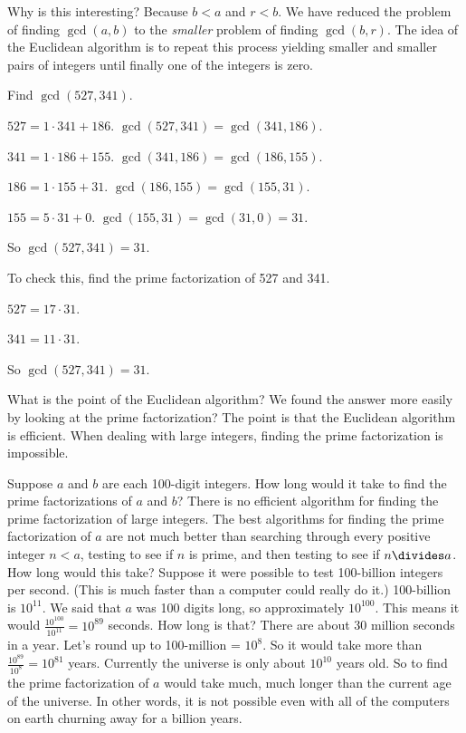 \documentclass[oneside,12pt]{amsart}
\begin{document}
Why is this interesting? Because $b<a$ and $r<b$. We have reduced the problem of finding $\gcd(a,b)$
to the \emph{smaller} problem of finding $\gcd(b,r)$. The idea of the Euclidean algorithm is to
repeat this process yielding smaller and smaller pairs of integers until finally one of the integers is zero.

\begin{example}
Find $\gcd(527,341)$.

$527 = 1 \cdot 341 + 186$. \qquad $\gcd(527,341) = \gcd(341,186)$.

$341 = 1 \cdot 186 + 155$. \qquad $\gcd(341, 186) = \gcd(186, 155)$.

$186 = 1 \cdot 155 +  31$. \qquad $\gcd(186, 155) = \gcd(155, 31)$.

$155 = 5 \cdot 31 + 0$. \qquad $\gcd(155, 31) = \gcd(31, 0) = 31$.

So $\gcd (527,341) = 31$.

To check this, find the prime factorization of 527 and 341.

$527 = 17 \cdot 31$.

$341 = 11 \cdot 31$.

So $\gcd(527, 341) = 31$.
\end{example}

What is the point of the Euclidean algorithm? We found the answer more easily by looking at the prime factorization? The point is that
the Euclidean algorithm is efficient. When dealing with large integers, finding the prime factorization is impossible.

Suppose $a$ and $b$ are each 100-digit integers. How long would it take to find the prime factorizations of $a$ and $b$?
There is no efficient algorithm for finding the prime factorization of large integers. The best algorithms for finding the prime factorization of $a$
are not much better than searching through every positive integer $n<a$, testing to see if $n$ is prime, and then testing to see if $n\divides a$.
How long would this take? Suppose it were possible to test 100-billion integers per second. (This is much faster than a computer could really do it.)
100-billion is $10^{11}$. We said that $a$ was 100 digits long, so approximately $10^{100}$. This means it would $\frac{10^{100}}{10^{11}} = 10^{89}$ seconds.
How long is that?
There are about 30 million seconds in a year. Let's round up to 100-million = $10^8$. So it would take more than $\frac{10^{89}}{10^{8}} = 10^{81}$ years.
Currently the universe is only about $10^{10}$ years old. So to find the prime factorization of $a$ would take much, much longer than the current age of the
universe. In other words, it is not possible even with all of the computers on earth churning away for a billion years.
\end{document}

